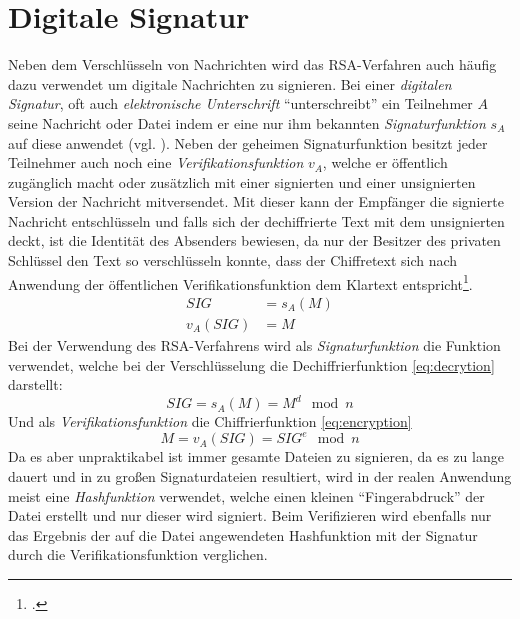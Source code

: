 \documentclass{scrarticle}
\begin{document}
    \section{Digitale Signatur} %
        Neben dem Verschlüsseln von Nachrichten wird das RSA-Verfahren auch häufig dazu verwendet um digitale Nachrichten zu signieren. Bei einer \emph{digitalen Signatur}, oft auch \emph{elektronische Unterschrift} \enquote{unterschreibt} ein Teilnehmer $A$ seine Nachricht oder Datei indem er eine nur ihm bekannten \emph{Signaturfunktion} $s_A$ auf diese anwendet (vgl. \cite[40-43]{beutelspacher2015}). Neben der geheimen Signaturfunktion besitzt jeder Teilnehmer auch noch eine \emph{Verifikationsfunktion} $v_A$, welche er öffentlich zugänglich macht oder zusätzlich mit einer signierten und einer unsignierten Version der Nachricht mitversendet. Mit dieser kann der Empfänger die signierte Nachricht entschlüsseln und falls sich der dechiffrierte Text mit dem unsignierten deckt, ist die Identität des Absenders bewiesen, da nur der Besitzer des privaten Schlüssel den Text so verschlüsseln konnte, dass der Chiffretext sich nach Anwendung der öffentlichen Verifikationsfunktion dem Klartext entspricht\footcite[vgl.][68]{watjen2008}.
        \begin{align}
            SIG &= s_A(M) \\
            v_A(SIG) &= M
        \end{align}
        Bei der Verwendung des RSA-Verfahrens wird als \emph{Signaturfunktion} die Funktion verwendet, welche bei der Verschlüsselung die Dechiffrierfunktion \ref{eq:decrytion} darstellt:
        \begin{equation}
            SIG = s_A(M) = M^{d}\mod{n}
        \end{equation}
        Und als \emph{Verifikationsfunktion} die Chiffrierfunktion \ref{eq:encryption}
        \begin{equation}
            M = v_A(SIG) = SIG^{e}\mod{n}
        \end{equation}
        Da es aber unpraktikabel ist immer gesamte Dateien zu signieren, da es zu lange dauert und in zu großen Signaturdateien resultiert, wird in der realen Anwendung meist eine \emph{Hashfunktion} verwendet, welche einen kleinen \enquote{Fingerabdruck} der Datei erstellt und nur dieser wird signiert. Beim Verifizieren wird ebenfalls nur das Ergebnis der auf die Datei angewendeten Hashfunktion mit der Signatur durch die Verifikationsfunktion verglichen.
\end{document}
